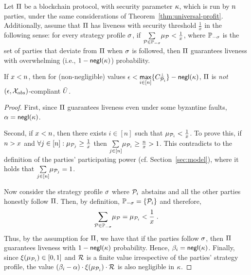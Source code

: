 \begin{corollary}\label{col:universal-profit-non-compliance}
    Let $\Pi$ be a blockchain protocol, with security parameter $\kappa$,
    which is run by $n$ parties, under the same considerations of
    Theorem~\ref{thm:universal-profit}.
    Additionally, assume that $\Pi$ has liveness with security threshold
    $\frac{1}{x}$ in the following sense: for every strategy profile
    $\sigma$, if $\underset{\mathcal{P} \in \mathbb{P}_{-\sigma}}{\sum}
    \mu_{\mathcal{P}} < \frac{1}{x}$, where $\mathbb{P}_{-\sigma}$ is the
    set of parties that deviate from $\Pi$ when $\sigma$ is followed, then
    $\Pi$ guarantees liveness with overwhelming (i.e.,
    $1-\mathsf{negl}(\kappa)$) probability.

    If $x < n$, then for (non-negligible) values
    $\epsilon < \underset{i \in [n]}{\mathsf{max}}\{C^\bot_{\mathcal{P}_i}\} - \mathsf{negl}(\kappa)$,
    $\Pi$ is \emph{not} $(\epsilon, \mathcal{X}_{abs})$-compliant \wrt $\bar{U}$.
\end{corollary}
\begin{proof}
    First, since $\Pi$ guarantees liveness even under some byzantine faults,
    $\alpha=\mathsf{negl}(\kappa)$.

    Second, if $x < n$, then there exists $i\in[n]$ such that
    $\mu_{\mathcal{P}_i} < \frac{1}{x}$. To prove this, if $n >
    x$ and $\forall j\in[n]: \mu_{\mathcal{P}_j} \geq \frac{1}{x}$ then
    $\underset{j \in [n]}{\sum} \mu_{\mathcal{P}_i} \geq \frac{n}{x} > 1$.
    This contradicts to the definition of the parties' participating power (cf.
    Section~\ref{sec:model}), where it holds that $\underset{j \in
    [n]}{\sum} \mu_{\mathcal{P}_j}=1$.

    Now consider the strategy profile $\sigma$ where $\mathcal{P}_i$ abstains and
    all the other parties honestly follow $\Pi$. Then, by definition,
    $\mathbb{P}_{-\sigma}=\{\mathcal{P}_i\}$ and therefore,
    \[\underset{\mathcal{P} \in \mathbb{P}_{-\sigma}}{\sum} \mu_{\mathcal{P}}=\mu_{\mathcal{P}_i} < \frac{1}{x}\;.\]
    Thus, by the assumption for $\Pi$, we have that if the parties follow
    $\sigma$, then $\Pi$ guarantees liveness with
    $1-\mathsf{negl}(\kappa)$ probability. Hence, $\beta_i =
    \mathsf{negl}(\kappa)$.  Finally, since
    $\xi(\mu_{\mathcal{P}_i}) \in [0, 1]$ and
    $\mathcal{R}$ is a finite value irrespective of the parties' strategy
    profile, the value $(\beta_i - \alpha) \cdot
    \xi(\mu_{\mathcal{P}_i}) \cdot \mathcal{R}$ is also
    negligible in $\kappa$.
\end{proof}

